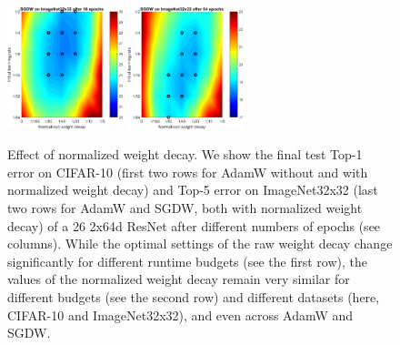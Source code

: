 \documentclass[usenames,dvipsnames]{article} %
\begin{document}
\begin{figure}[p]
\begin{center}
  \includegraphics[width=0.3\textwidth]{sfig2_SGDWR_16.pdf}
  \includegraphics[width=0.3\textwidth]{sfig2_SGDWR_64.pdf}
\caption{\label{sfig_2} Effect of normalized weight decay. We show the final test Top-1 error on CIFAR-10 (first two rows for AdamW without and with normalized weight decay) and Top-5 error on ImageNet32x32 (last two rows for AdamW and SGDW, both with normalized weight decay) of a 26 2x64d ResNet after different numbers of epochs (see columns). While the optimal settings of the raw weight decay change significantly for different runtime budgets (see the first row), the values of the normalized weight decay remain very similar for different budgets (see the second row) and different datasets (here, CIFAR-10 and ImageNet32x32), and even across AdamW and SGDW.}
\end{center}
\end{figure}
\end{document}
